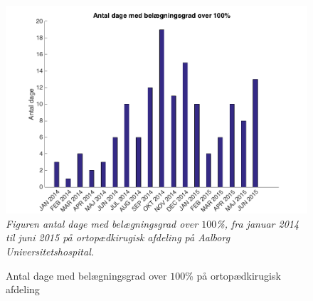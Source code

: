 \begin{figure}[H]
	\flushleft 
	\caption{Antal dage med belægningsgrad over $100$\% på ortopædkirugisk afdeling}
	\centering
	\includegraphics[scale=.7]{figures/antaldage.png}
	\label{antaldage}
	\flushleft
	\textit{Figuren antal dage med belægningsgrad over $100$\%, fra januar 2014 til juni 2015 på ortopædkirugisk afdeling på Aalborg Universitetshospital.\cite{SDS2015}}
\end{figure}